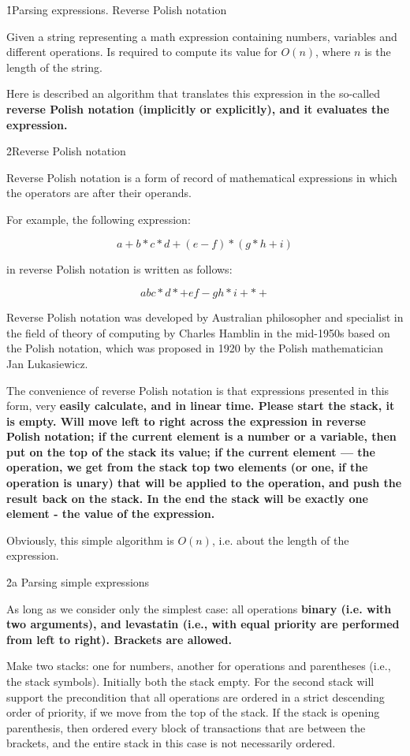 \h1{Parsing expressions. Reverse Polish notation}

Given a string representing a math expression containing numbers, variables and different operations. Is required to compute its value for $O (n)$, where $n$ is the length of the string.

Here is described an algorithm that translates this expression in the so-called \bf{reverse Polish notation} (implicitly or explicitly), and it evaluates the expression.


\h2{Reverse Polish notation}

Reverse Polish notation is a form of record of mathematical expressions in which the operators are after their operands.

For example, the following expression:

$$ a + b * c * d + (e - f) * (g * h + i) $$

in reverse Polish notation is written as follows:

$$ a b c * d * + e f - g h * i + * + $$

Reverse Polish notation was developed by Australian philosopher and specialist in the field of theory of computing by Charles Hamblin in the mid-1950s based on the Polish notation, which was proposed in 1920 by the Polish mathematician Jan Lukasiewicz.

The convenience of reverse Polish notation is that expressions presented in this form, very \bf{easily calculate}, and in linear time. Please start the stack, it is empty. Will move left to right across the expression in reverse Polish notation; if the current element is a number or a variable, then put on the top of the stack its value; if the current element --- the operation, we get from the stack top two elements (or one, if the operation is unary) that will be applied to the operation, and push the result back on the stack. In the end the stack will be exactly one element - the value of the expression.

Obviously, this simple algorithm is $O (n)$, i.e. about the length of the expression.


\h2{a Parsing simple expressions}

As long as we consider only the simplest case: all operations \bf{binary} (i.e. with two arguments), and \bf{levastatin} (i.e., with equal priority are performed from left to right). Brackets are allowed.

Make two stacks: one for numbers, another for operations and parentheses (i.e., the stack symbols). Initially both the stack empty. For the second stack will support the precondition that all operations are ordered in a strict descending order of priority, if we move from the top of the stack. If the stack is opening parenthesis, then ordered every block of transactions that are between the brackets, and the entire stack in this case is not necessarily ordered.

